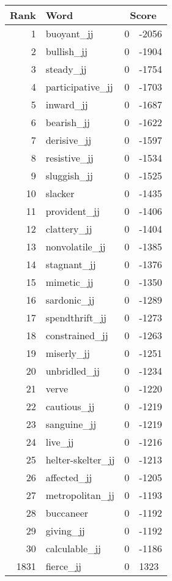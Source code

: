 \begin{longtable}[!htbp]{| rlr@{.}l |}
    \hline
    \textbf{Rank} & \textbf{Word} & \multicolumn{2}{c|}{\textbf{Score}} \\
    \hline
    \endhead
    1 & buoyant\_jj & 0 & -2056 \\
    2 & bullish\_jj & 0 & -1904 \\
    3 & steady\_jj & 0 & -1754 \\
    4 & participative\_jj & 0 & -1703 \\
    5 & inward\_jj & 0 & -1687 \\
    6 & bearish\_jj & 0 & -1622 \\
    7 & derisive\_jj & 0 & -1597 \\
    8 & resistive\_jj & 0 & -1534 \\
    9 & sluggish\_jj & 0 & -1525 \\
    10 & slacker & 0 & -1435 \\
    11 & provident\_jj & 0 & -1406 \\
    12 & clattery\_jj & 0 & -1404 \\
    13 & nonvolatile\_jj & 0 & -1385 \\
    14 & stagnant\_jj & 0 & -1376 \\
    15 & mimetic\_jj & 0 & -1350 \\
    16 & sardonic\_jj & 0 & -1289 \\
    17 & spendthrift\_jj & 0 & -1273 \\
    18 & constrained\_jj & 0 & -1263 \\
    19 & miserly\_jj & 0 & -1251 \\
    20 & unbridled\_jj & 0 & -1234 \\
    21 & verve & 0 & -1220 \\
    22 & cautious\_jj & 0 & -1219 \\
    23 & sanguine\_jj & 0 & -1219 \\
    24 & live\_jj & 0 & -1216 \\
    25 & helter-skelter\_jj & 0 & -1213 \\
    26 & affected\_jj & 0 & -1205 \\
    27 & metropolitan\_jj & 0 & -1193 \\
    28 & buccaneer & 0 & -1192 \\
    29 & giving\_jj & 0 & -1192 \\
    30 & calculable\_jj & 0 & -1186 \\
    1831 & fierce\_jj & 0 & 1323 \\

\end{longtable}
